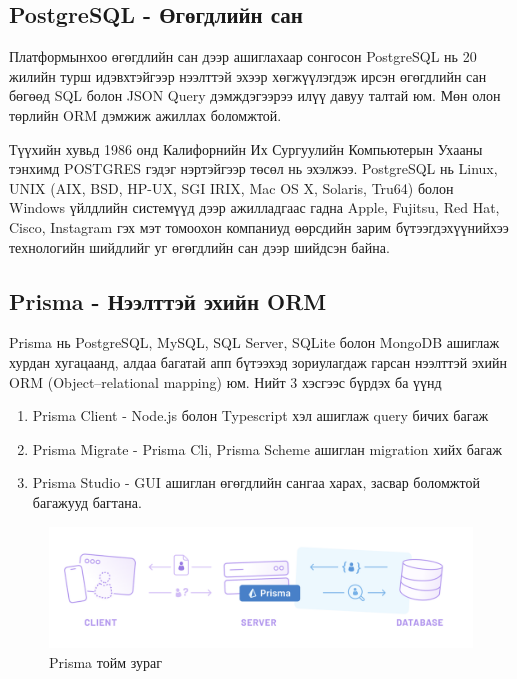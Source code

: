 \subsection{PostgreSQL - Өгөгдлийн сан}

Платформынхоо өгөгдлийн сан дээр ашиглахаар сонгосон PostgreSQL нь 20 жилийн турш идэвхтэйгээр нээлттэй эхээр хөгжүүлэгдэж ирсэн өгөгдлийн сан бөгөөд SQL болон JSON Query дэмждэгээрээ илүү давуу талтай юм. Мөн олон төрлийн ORM дэмжиж ажиллах боломжтой.

Түүхийн хувьд 1986 онд Калифорнийн Их Сургуулийн Компьютерын Ухааны тэнхимд POSTGRES гэдэг нэртэйгээр төсөл нь эхэлжээ. PostgreSQL нь Linux, UNIX (AIX, BSD, HP-UX, SGI IRIX, Mac OS X, Solaris, Tru64) болон Windows үйлдлийн системүүд дээр ажилладгаас гадна Apple, Fujitsu, Red Hat, Cisco, Instagram гэх мэт томоохон компаниуд өөрсдийн зарим бүтээгдэхүүнийхээ технологийн шийдлийг уг өгөгдлийн сан дээр шийдсэн байна.

\subsection{Prisma - Нээлттэй эхийн ORM}

Prisma нь PostgreSQL, MySQL, SQL Server, SQLite болон MongoDB ашиглаж хурдан хугацаанд, алдаа багатай апп бүтээхэд зориулагдаж гарсан нээлттэй эхийн ORM (Object–relational mapping) юм. Нийт 3 хэсгээс бүрдэх ба үүнд 

\begin{enumerate}
	\item Prisma Client - Node.js болон Typescript хэл ашиглаж query бичих багаж
	\item Prisma Migrate - Prisma Cli, Prisma Scheme ашиглан migration хийх багаж
	\item Prisma Studio - GUI ашиглан өгөгдлийн сангаа харах, засвар боломжтой багажууд багтана.
\end{enumerate}

\begin{figure}[h]
	\centering
	\includegraphics[width=15cm]{images/prisma-stack.png}
	\caption{Prisma тойм зураг}
	\label{fig:prisma}
\end{figure}

